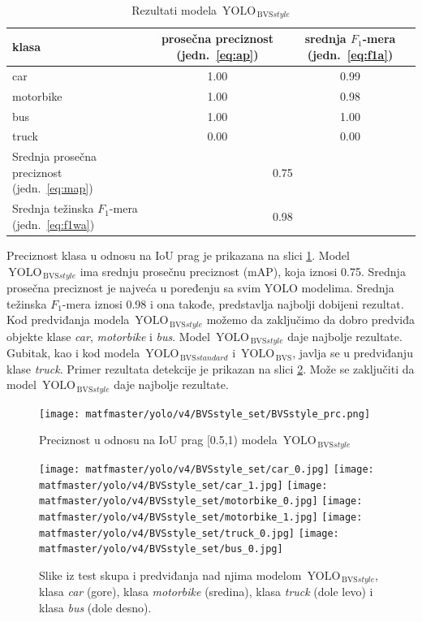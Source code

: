 \documentclass[12pt,oneside]{memoir}
\newcommand{\yolo}{\ensuremath{\,\textrm{YOLO}}}
\newcommand{\bvs}{\ensuremath{\,\textrm{BVS}}}
\begin{document}
\begin{table}
    \begin{center}
    \caption{Rezultati modela $\yolo_{\bvs{style}}$}
        \begin{tabular}{|m{10em}|c|c|}
        \toprule
        klasa     & prosečna preciznost (jedn.~\ref{eq:ap}) & srednja $F_1$-mera (jedn.~\ref{eq:f1a})  \\ \hline
        \midrule
        car       & 1.00   & 0.99 \\ \hline
        motorbike & 1.00   & 0.98 \\ \hline
        bus       & 1.00   & 1.00 \\ \hline
        truck     & 0.00   & 0.00 \\ \hline
        \bottomrule
        Srednja prosečna preciznost (jedn.~\ref{eq:map}) & \multicolumn{2}{c|}{0.75}  \\ \hline
        Srednja težinska $F_1$-mera (jedn.~\ref{eq:f1wa}) & \multicolumn{2}{c|}{0.98}  \\
        \hline
    \end{tabular}
    \label{tab:YOLO4_BVSstyle_results}
    \end{center}
\end{table}

Preciznost klasa u odnosu na IoU prag je prikazana na slici \ref{fig:YOLO4_BVSstyle_prc}. Model $\yolo_{\bvs{style}}$ ima srednju prosečnu preciznost (mAP), koja iznosi 0.75. Srednja prosečna preciznost je najveća u poređenju sa svim YOLO modelima. Srednja težinska $F_1$-mera iznosi 0.98 i ona takođe, predstavlja najbolji dobijeni rezultat. Kod predviđanja modela $\yolo_{\bvs{style}}$ možemo da zaključimo da dobro predviđa objekte klase \textit{car}, \textit{motorbike} i \textit{bus}. Model $\yolo_{\bvs{style}}$ daje najbolje rezultate. Gubitak, kao i kod modela $\yolo_{\bvs{standard}}$ i $\yolo_{\bvs}$, javlja se u predviđanju klase \textit{truck}. Primer rezultata detekcije je prikazan na slici \ref{fig:YOLO4_BVSstyle_predictions}. Može se zaključiti da model $\yolo_{\bvs{style}}$ daje najbolje rezultate.



\begin{figure}[!ht]
    \centering
    \texttt{[image: matfmaster/yolo/v4/BVSstyle\_set/BVSstyle\_prc.png]}
    \caption{Preciznost u odnosu na IoU prag [0.5,1) modela $\yolo_{\bvs{style}}$}
    \label{fig:YOLO4_BVSstyle_prc}
\end{figure}


\begin{figure}[!htbp]
\centering
  \texttt{[image: matfmaster/yolo/v4/BVSstyle\_set/car\_0.jpg]}
  \texttt{[image: matfmaster/yolo/v4/BVSstyle\_set/car\_1.jpg]}
  \texttt{[image: matfmaster/yolo/v4/BVSstyle\_set/motorbike\_0.jpg]}
  \texttt{[image: matfmaster/yolo/v4/BVSstyle\_set/motorbike\_1.jpg]}
  \texttt{[image: matfmaster/yolo/v4/BVSstyle\_set/truck\_0.jpg]}
  \texttt{[image: matfmaster/yolo/v4/BVSstyle\_set/bus\_0.jpg]}
\caption{Slike iz test skupa i predviđanja nad njima modelom $\yolo_{\bvs{style}}$, klasa \textit{car} (gore), klasa \textit{motorbike} (sredina), klasa \textit{truck} (dole levo) i klasa \textit{bus} (dole desno).}
\label{fig:YOLO4_BVSstyle_predictions}
\end{figure}
\end{document}
